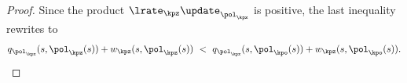 \begin{proof}
Since the product $\lrate_\kpz \update_{\pol_\kpz}$ is positive, the last inequality rewrites to
\begin{align}
    q_{\pol_\kpz}(s, \pol_\kpz(s)) + w_\kpz(s, \pol_\kpz(s))
    \ < \
    q_{\pol_\kpz}(s, \pol_\kpo(s)) + w_\kpz(s, \pol_\kpo(s)).
\end{align}
\end{proof}
